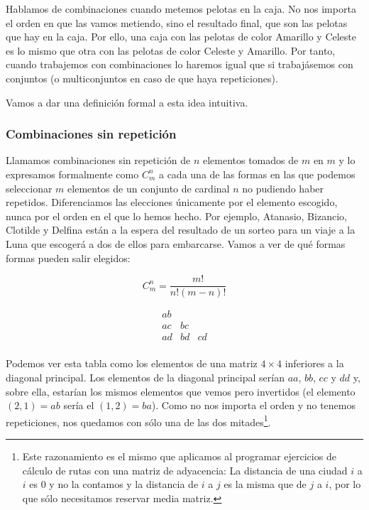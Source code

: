 Hablamos de combinaciones cuando metemos pelotas en la caja.
No nos importa el orden en que las vamos metiendo, sino el resultado final, que son las pelotas que hay en la caja.
Por ello, una caja con las pelotas de color Amarillo y Celeste es lo mismo que otra con las pelotas de color Celeste y Amarillo.
Por tanto, cuando trabajemos con combinaciones lo haremos igual que si trabajásemos con conjuntos (o multiconjuntos en caso de que haya repeticiones).

Vamos a dar una definición formal a esta idea intuitiva.

\subsubsection{Combinaciones sin repetición}

Llamamos combinaciones sin repetición de $n$ elementos tomados de $m$ en $m$ y lo expresamos formalmente como $C_{m}^{n}$ a cada una de las formas en las que podemos seleccionar $m$ elementos de un conjunto de cardinal $n$ no pudiendo haber repetidos.
Diferenciamos las elecciones únicamente por el elemento escogido, nunca por el orden en el que lo hemos hecho.
Por ejemplo, Atanasio, Bizancio, Clotilde y Delfina están a la espera del resultado de un sorteo para un viaje a la Luna que escogerá a dos de ellos para embarcarse.
Vamos a ver de qué formas formas pueden salir elegidos:

\[C_{m}^{n} = \frac{m!}{n!(m-n)!}\]

\[
\begin{array}{cccc}
	ab &    &    \\
	ac & bc &    \\
	ad & bd & cd \\
\end{array}
\]

Podemos ver esta tabla como los elementos de una matriz $4 \times 4$ inferiores a la diagonal principal.
Los elementos de la diagonal principal serían $aa$, $bb$, $cc$ y $dd$ y, sobre ella, estarían los mismos elementos que vemos pero invertidos (el elemento $(2,1) = ab$ sería el $(1,2) = ba$).
Como no nos importa el orden y no tenemos repeticiones, nos quedamos con sólo una de las dos mitades\footnote{%
	Este razonamiento es el mismo que aplicamos al programar ejercicios de cálculo de rutas con una matriz de adyacencia:
	La distancia de una ciudad $i$ a $i$ es 0 y no la contamos y la distancia de $i$ a $j$ es la misma que de $j$ a $i$, por lo que sólo necesitamos reservar media matriz.
}.


